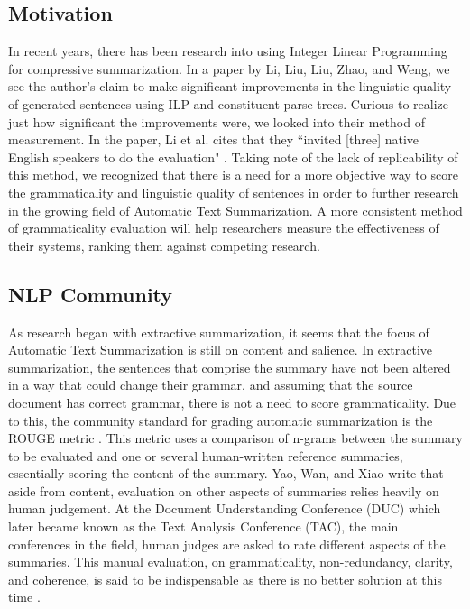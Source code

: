 \documentclass[11pt,a4paper]{article}
\begin{document}
\begin{multicols}{2}
\subsection{Motivation}
In recent years, there has been research into using Integer Linear Programming for compressive summarization. In a paper by Li, Liu, Liu, Zhao, and Weng, we see the author's claim to make significant improvements in the linguistic quality of generated sentences using ILP and constituent parse trees. \cite{li2014} Curious to realize just how significant the improvements were, we looked into their method of measurement. In the paper, Li et al. cites that they ``invited [three] native English speakers to do the evaluation" \cite{li2014}. Taking note of the lack of replicability of this method, we recognized that there is a need for a more objective way to score the grammaticality and linguistic quality of sentences in order to further research in the growing field of Automatic Text Summarization. A more consistent method of grammaticality evaluation will help researchers measure the effectiveness of their systems, ranking them against competing research.

\subsection{NLP Community}
As research began with extractive summarization, it seems that the focus of Automatic Text Summarization is still on content and salience. In extractive summarization, the sentences that comprise the summary have not been altered in a way that could change their grammar, and assuming that the source document has correct grammar, there is not a need to score grammaticality. Due to this, the community standard for grading automatic summarization is the ROUGE metric \cite{yao2017}. This metric uses a comparison of n-grams between the summary to be evaluated and one or several human-written reference summaries, essentially scoring the content of the summary. Yao, Wan, and Xiao write that aside from content, evaluation on other aspects of summaries relies heavily on human judgement. At the Document Understanding Conference (DUC) which later became known as the Text Analysis Conference (TAC), the main conferences in the field, human judges are asked to rate different aspects of the summaries. This manual evaluation, on grammaticality, non-redundancy, clarity, and coherence, is said to be indispensable as there is no better solution at this time \cite{yao2017}.


\end{multicols}
\end{document}
